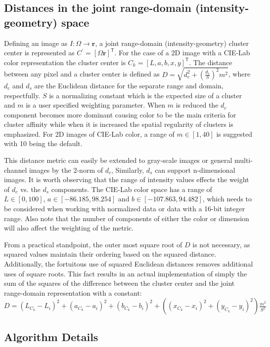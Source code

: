 \documentclass{InsightArticle}
\begin{document}
\subsection{Distances in the joint range-domain (intensity-geometry) space}

Defining an image as $I:\Omega \rightarrow \mathbf{r}$, a joint range-domain (intensity-geometry)
cluster center is represented as $C^\prime=[\Omega \mathbf{r}]^\mathsf{T}$. For the case of a 2D
image with a CIE-Lab color representation the cluster center is \mbox{$ C_k =[L, a, b,
  x, y]^\mathsf{T} $}. The distance between any pixel and a cluster center is
defined as $D=\sqrt{d_c^2+\left(\frac{d_s}{S}\right)^2m^2}$, where $d_c$ and $d_s$
are the Euclidean distance for the separate range and domain,
respectfully. $S$ is a normalizing constant which is the expected size
of a cluster and $m$ is a user specified weighting parameter. When $m$ is reduced the $d_c$
component becomes more dominant causing color to be the main criteria for cluster affinity while when
it is increased the spatial regularity of clusters is emphasized. For 2D images of CIE-Lab color,
a range of $m\in[1,40]$ is suggested with 10 being the default.

This distance metric can easily be extended to gray-scale images or
general multi-channel images by the 2-norm of $d_c$,
Similarly, $d_s$ can support n-dimensional images. It is
worth observing that the range of intensity values effects the weight of
$d_c$ vs. the $d_s$ components. The CIE-Lab color space has a range
of $L\in[0,100]$, $a\in[-86.185, 98.254]$ and $b\in[-107.863, 94.482]$,
which needs to be considered when working with normalized data or data
with a 16-bit integer range. Also note that the number of
components of either the color or dimension will also affect the
weighting of the metric.

From a practical standpoint, the outer most square root of $D$ is not necessary, as squared
values maintain their ordering based on the squared distance. Additionally, the fortuitous use of squared
Euclidean distances removes additional uses of square roots. This fact
results in an actual implementation of simply the sum of the squares
of the difference between the cluster center and the joint range-domain
representation with a constant:
\mbox{$D=(L_{C_k}-L_i)^2+(a_{C_k}-a_i)^2+(b_{C_k}-b_i)^2+((x_{C_k}-x_i)^2+(y_{C_k}-y_i)^2)\frac{m^2}{S^2}$}

\subsection{Algorithm Details}
\end{document}
